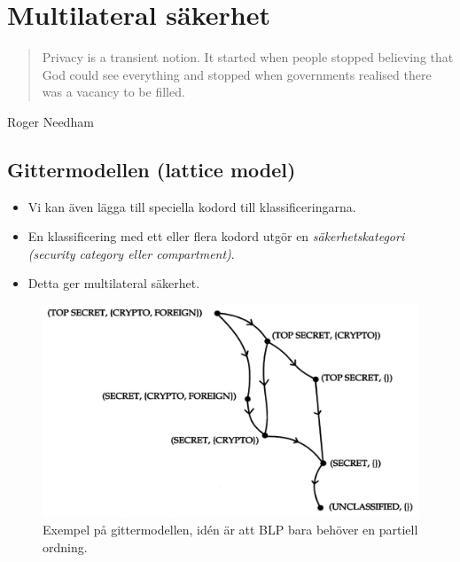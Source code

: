 \mode*




\section{Multilateral säkerhet}
\begin{frame}{\insertsubsectionhead}
  \begin{quote}
    Privacy is a transient notion.
    It started when people stopped believing that God could see everything and 
    stopped when governments realised there was a vacancy to be filled.
  \end{quote}
  \begin{flushright}
    Roger Needham
  \end{flushright}
\end{frame}

\subsection{Gittermodellen (lattice model)}
\begin{frame}{\insertsubsectionhead}
  \begin{itemize}
    \item Vi kan även lägga till speciella kodord till klassificeringarna.
    \item En klassificering med ett eller flera kodord utgör en 
      \emph{säkerhetskategori (security category eller compartment)}.
    \item Detta ger multilateral säkerhet.
  \end{itemize}
\end{frame}

\begin{frame}{\insertsubsectionhead}
  \begin{figure}
    \includegraphics[height=0.7\textheight]{lattice.png}
    \caption{Exempel på gittermodellen, idén är att BLP bara behöver en 
    partiell ordning.}
  \end{figure}
\end{frame}

